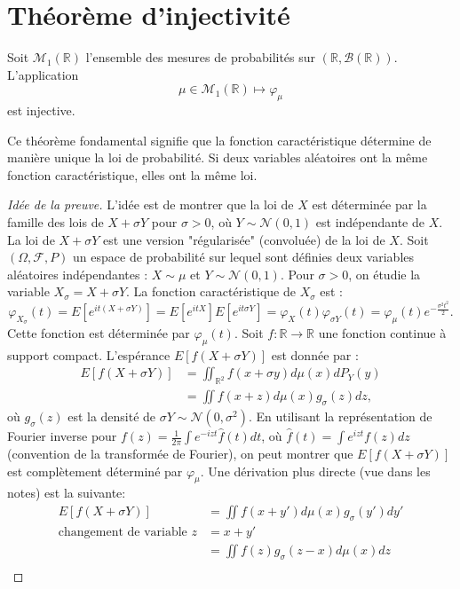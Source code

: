 \section{Théorème d'injectivité}
\begin{theorem}
Soit $\mathcal{M}_1(\mathbb{R})$ l'ensemble des mesures de probabilités sur $(\mathbb{R}, \mathcal{B}(\mathbb{R}))$. L'application
\[ \mu \in \mathcal{M}_1(\mathbb{R}) \mapsto \varphi_{\mu} \]
est injective.
\end{theorem}
Ce théorème fondamental signifie que la fonction caractéristique détermine de manière unique la loi de probabilité. Si deux variables aléatoires ont la même fonction caractéristique, elles ont la même loi.
\begin{proof}[Idée de la preuve]
L'idée est de montrer que la loi de $X$ est déterminée par la famille des lois de $X+\sigma Y$ pour $\sigma > 0$, où $Y \sim \mathcal{N}(0,1)$ est indépendante de $X$. La loi de $X+\sigma Y$ est une version "régularisée" (convoluée) de la loi de $X$.
Soit $(\Omega, \mathcal{F}, P)$ un espace de probabilité sur lequel sont définies deux variables aléatoires indépendantes : $X \sim \mu$ et $Y \sim \mathcal{N}(0,1)$. Pour $\sigma > 0$, on étudie la variable $X_\sigma = X+\sigma Y$.
La fonction caractéristique de $X_\sigma$ est :
\[ \varphi_{X_\sigma}(t) = E[e^{it(X+\sigma Y)}] = E[e^{itX}]E[e^{it\sigma Y}] = \varphi_X(t) \varphi_{\sigma Y}(t) = \varphi_\mu(t) e^{-\frac{\sigma^2 t^2}{2}}. \]
Cette fonction est déterminée par $\varphi_\mu(t)$.
Soit $f: \mathbb{R} \to \mathbb{R}$ une fonction continue à support compact. L'espérance $E[f(X+\sigma Y)]$ est donnée par :
\begin{align*}
E[f(X+\sigma Y)] &= \iint_{\mathbb{R}^2} f(x+\sigma y) d\mu(x) dP_Y(y) \\
&= \iint f(x+z) d\mu(x) g_\sigma(z) dz,
\end{align*}
où $g_\sigma(z)$ est la densité de $\sigma Y \sim \mathcal{N}(0,\sigma^2)$.
En utilisant la représentation de Fourier inverse pour $f(z) = \frac{1}{2\pi} \int e^{-izt} \hat{f}(t) dt$, où $\hat{f}(t) = \int e^{izt}f(z)dz$ (convention de la transformée de Fourier), on peut montrer que $E[f(X+\sigma Y)]$ est complètement déterminé par $\varphi_\mu$. Une dérivation plus directe (vue dans les notes) est la suivante:
\begin{align*}
E[f(X+\sigma Y)] &= \iint f(x+y') d\mu(x) g_\sigma(y') dy' \\
\text{changement de variable } z &= x+y' \\
&= \iint f(z) g_\sigma(z-x) d\mu(x) dz \\

\end{align*}
\end{proof}
